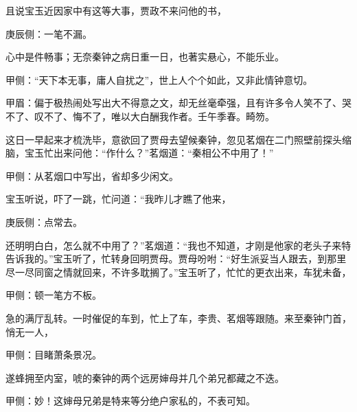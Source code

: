 \begin{parag}
    且说宝玉近因家中有这等大事，贾政不来问他的书，\begin{note}庚辰侧：一笔不漏。\end{note}心中是件畅事；无奈秦钟之病日重一日，也著实悬心，不能乐业。\begin{note}甲侧：“天下本无事，庸人自扰之”，世上人个个如此，又非此情钟意切。\end{note}\begin{note}甲眉：偏于极热闹处写出大不得意之文，却无丝毫牵强，且有许多令人笑不了、哭不了、叹不了、悔不了，唯以大白酬我作者。壬午季春。畸笏。\end{note}这日一早起来才梳洗毕，意欲回了贾母去望候秦钟，忽见茗烟在二门照壁前探头缩脑，宝玉忙出来问他：“作什么？”茗烟道：“秦相公不中用了！”\begin{note}甲侧：从茗烟口中写出，省却多少闲文。\end{note}宝玉听说，吓了一跳，忙问道：“我昨儿才瞧了他来，\begin{note}庚辰侧：点常去。\end{note}还明明白白，怎么就不中用了？”茗烟道：“我也不知道，才刚是他家的老头子来特告诉我的。”宝玉听了，忙转身回明贾母。贾母吩咐：“好生派妥当人跟去，到那里尽一尽同窗之情就回来，不许多耽搁了。”宝玉听了，忙忙的更衣出来，车犹未备，\begin{note}甲侧：顿一笔方不板。\end{note}急的满厅乱转。一时催促的车到，忙上了车，李贵、茗烟等跟随。来至秦钟门首，悄无一人，\begin{note}甲侧：目睹萧条景况。\end{note}遂蜂拥至内室，唬的秦钟的两个远房婶母并几个弟兄都藏之不迭。\begin{note}甲侧：妙！这婶母兄弟是特来等分绝户家私的，不表可知。\end{note}
\end{parag}


